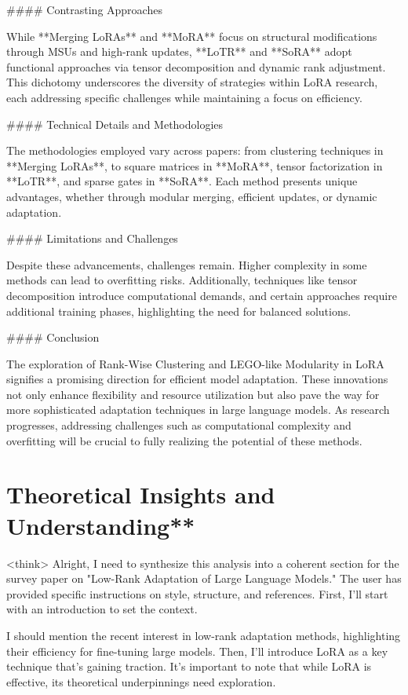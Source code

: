 \documentclass[conference]{IEEEtran}
\begin{document}
#### Contrasting Approaches

While **Merging LoRAs** and **MoRA** focus on structural modifications through MSUs and high-rank updates, **LoTR** and **SoRA** adopt functional approaches via tensor decomposition and dynamic rank adjustment. This dichotomy underscores the diversity of strategies within LoRA research, each addressing specific challenges while maintaining a focus on efficiency.

#### Technical Details and Methodologies

The methodologies employed vary across papers: from clustering techniques in **Merging LoRAs**, to square matrices in **MoRA**, tensor factorization in **LoTR**, and sparse gates in **SoRA**. Each method presents unique advantages, whether through modular merging, efficient updates, or dynamic adaptation.

#### Limitations and Challenges

Despite these advancements, challenges remain. Higher complexity in some methods can lead to overfitting risks. Additionally, techniques like tensor decomposition introduce computational demands, and certain approaches require additional training phases, highlighting the need for balanced solutions.

#### Conclusion

The exploration of Rank-Wise Clustering and LEGO-like Modularity in LoRA signifies a promising direction for efficient model adaptation. These innovations not only enhance flexibility and resource utilization but also pave the way for more sophisticated adaptation techniques in large language models. As research progresses, addressing challenges such as computational complexity and overfitting will be crucial to fully realizing the potential of these methods.

\section{Theoretical Insights and Understanding**}
<think>
Alright, I need to synthesize this analysis into a coherent section for the survey paper on "Low-Rank Adaptation of Large Language Models." The user has provided specific instructions on style, structure, and references. First, I'll start with an introduction to set the context.

I should mention the recent interest in low-rank adaptation methods, highlighting their efficiency for fine-tuning large models. Then, I'll introduce LoRA as a key technique that's gaining traction. It's important to note that while LoRA is effective, its theoretical underpinnings need exploration.
\end{document}

